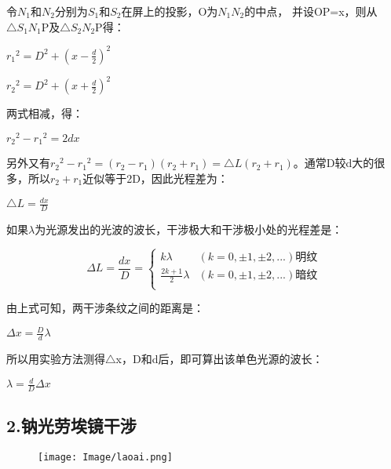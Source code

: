 \documentclass[11pt,a4paper,oneside]{article}
\begin{document}
令$N_1$和$N_2$分别为$S_1$和$S_2$在屏上的投影，O为${N_1}{N_2}$的中点，
并设OP=x，则从${{\bigtriangleup}{S_1}{N_1}\text{P}}$及${\bigtriangleup}{S_2}{N_2}$P得：

\begin{center}
${r_1}^2=D^2+(x-{\displaystyle\frac{d}{2}})^2$
\end{center}

\begin{center}
${r_2}^2=D^2+(x+{\displaystyle\frac{d}{2}})^2$
\end{center}

两式相减，得：
\begin{center}
${r_2}^2-{r_1}^2=2dx$
\end{center}


另外又有${r_2}^2-{r_1}^2=({r_2}-{r_1})({r_2}+{r_1})={\bigtriangleup}L({r_2}+{r_1})$。通常D较d大的很多，所以${r_2}+{r_1}$近似等于2D，因此光程差为：

\begin{center}
${\bigtriangleup}L=\displaystyle\frac{dx}{D}$
\end{center}

如果$\lambda$为光源发出的光波的波长，干涉极大和干涉极小处的光程差是：

$$\Delta L=\frac{dx}{D}=
\left\{
\begin{aligned} 
k\lambda & (k=0,\pm 1,\pm2,...) \text{明纹}\\
 \displaystyle\frac{2k+1}{2}\lambda & (k=0,\pm 1,\pm2,...)　\text{暗纹}\\
\end{aligned}
\right.
$$


由上式可知，两干涉条纹之间的距离是：

\begin{center}
$\Delta x=\displaystyle\frac{D}{d}\lambda$
\end{center}

所以用实验方法测得$\bigtriangleup$x，D和d后，即可算出该单色光源的波长：

\begin{center}
$\lambda =\displaystyle\frac{d}{D}{\Delta x}$
\end{center}

\subsection*{2.钠光劳埃镜干涉}

\begin{figure}[htbp]
 \centering
  \texttt{[image: Image/laoai.png]}
\end{figure}
\end{document}
